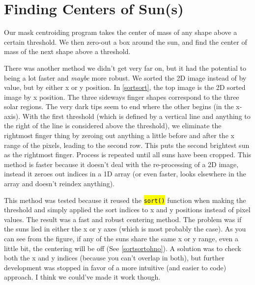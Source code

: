 \documentclass[10pt]{scrartcl}
\begin{document}

\section{Finding Centers of Sun(s)} %
\label{sec:finding_centers_of_sun}

Our mask centroiding program takes the center of mass of any shape above a certain threshold. We then zero-out a box around the sun, and find the center of mass of the next shape above a threshold. 

There was another method we didn't get very far on, but it had the potential to being a lot faster and \emph{maybe} more robust. We sorted the 2D image instead of by value, but by either x or y position. In \cref{sortsort}, the top image is the 2D sorted image by x position. The three sideways finger shapes correspond to the three solar regions. The very dark tips seem to end where the other begins (in the x-axis). With the first threshold (which is defined by a vertical line and anything to the right of the line is considered above the threshold), we eliminate the rightmost finger thing by zeroing out anything a little before and after the x range of the pixels, leading to the second row. This puts the second brightest sun as the rightmost finger. Process is repeated until all suns have been cropped. This method is faster because it doesn't deal with the re-processing of a 2D image, instead it zeroes out indices in a 1D array (or even faster, looks elsewhere in the array and doesn't reindex anything).

This method was tested because it reused the \hl{\texttt{sort()}} function when making the threshold and simply applied the sort indices to x and y positions instead of pixel values. The result was a fast and robust centering method. The problem was if the suns lied in either the x or y axes (which is most probably the case). As you can see from the figure, if any of the suns share the same x or y range, even a little bit, the centering will be off (See \cref{sortsortohno}). A solution was to check both the x and y indices (because you can't overlap in both), but further development was stopped in favor of a more intuitive (and easier to code) approach. I think we could've made it work though.\\

\end{document}

